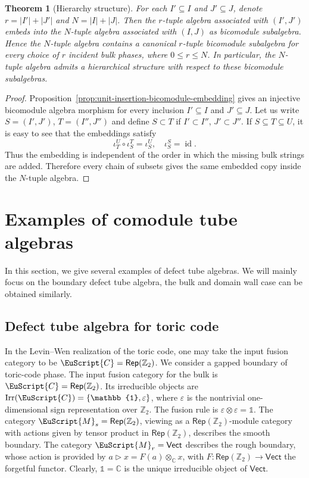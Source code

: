 \documentclass[a4paper,11pt]{article}
\newtheorem{theorem}{Theorem}[section]
\theoremstyle{definition}
\theoremstyle{remark}
\newcommand\eC           {\EuScript{C}}
\newcommand\eM          {\EuScript{M}}
\newcommand{\Rep}{\mathsf{Rep}}
\newcommand{\id}{\operatorname{id}}
\newcommand{\Irr}{\operatorname{Irr}}
\newcommand{\Vect}{\mathsf{Vect}}
\begin{document}
\begin{theorem}[Hierarchy structure]
    \label{thm:hierarchy-multi-module-defect-tubes}
    For each $I'\subseteq I$ and $J'\subseteq J$, denote $r=|I'|+|J'|$ and $N=|I|+|J|$. Then the $r$-tuple algebra
    associated with $(I',J')$
    embeds into the $N$-tuple algebra associated with $(I,J)$ as bicomodule subalgebra. 
    Hence the $N$-tuple algebra contains a canonical $r$-tuple bicomodule subalgebra for every choice of $r$ incident bulk phases, where $0\leq r\leq N$. 
    In particular, the $N$-tuple algebra admits a hierarchical structure with respect to these bicomodule subalgebras.
\end{theorem}

\begin{proof}
    Proposition~\ref{prop:unit-insertion-bicomodule-embedding} gives an injective bicomodule algebra morphism for every inclusion $I'\subseteq I$ and $J'\subseteq J$. Let us write $S=(I',J')$, $T=(I'',J'')$  and define $S\subset T$ if $I'\subset I''$, $J'\subset J''$. If $S\subseteq T\subseteq U$, it is easy to see that the embeddings satisfy
    \[
        \iota_{T}^{U}\circ\iota_{S}^{T}= \iota_{S}^{U},\quad\iota_{S}^{S}=
        \id.
    \]
    Thus the embedding is independent of the order in which the missing bulk strings are added.  Therefore every chain of subsets gives the same embedded copy inside the $N$-tuple algebra.  
\end{proof}

\section{Examples of comodule tube algebras}
\label{sec:exmp}
In this section, we give several examples of defect tube algebras. We will mainly focus on the boundary defect tube algebra, the bulk and domain wall case can be obtained similarly.

\subsection{Defect tube algebra for toric code}
\label{sec:ExpTubeToric}




In the Levin--Wen realization of the toric code, one may take the input fusion category to be $\eC=\Rep(\mathbb Z_2)$. 
We consider a gapped boundary of toric-code phase. The input fusion category for the bulk is $\eC=\Rep(\mathbb Z_2)$. Its irreducible objects are $\Irr(\eC)=\{\mathbb{1},\varepsilon\}$, where $\varepsilon$ is the nontrivial one-dimensional sign representation over $\mathbb{Z}_2$. The fusion rule is $\varepsilon\otimes \varepsilon = \mathbb{1}$. 
The category $\eM_s=\Rep(\mathbb{Z}_2)$, viewing as a $\Rep(\mathbb Z_2)$-module category with actions given by tensor product in $\Rep(\mathbb{Z}_2)$, describes the smooth boundary. 
The category $\eM_r=\Vect$ describes the rough boundary, whose action is provided by $a\triangleright x=F(a)\otimes_{\mathbb{C}} x$, with $F:\Rep(\mathbb Z_2)\to \Vect$ the forgetful functor. Clearly, $\mathbb{1}=\mathbb{C}$ is the unique irreducible object of $\Vect$. 
\end{document}
